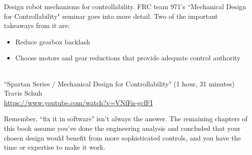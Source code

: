 Design robot mechanisms for controllability. FRC team 971's ``Mechanical Design
for Controllability" seminar goes into more detail. Two of the important
takeaways from it are:
\begin{itemize}
  \item Reduce gearbox backlash
  \item Choose motors and gear reductions that provide adequate control
        authority
\end{itemize}
\begin{bookfigure}
   \\
  ``Spartan Series / Mechanical Design for Controllability" (1 hour, 31 minutes)
    \\
  \footnotesize Travis Schuh \\
  \url{https://www.youtube.com/watch?v=VNfFn-gcfFI}
\end{bookfigure}

Remember, ``fix it in software" isn't always the answer. The remaining chapters
of this book assume you've done the engineering analysis and concluded that your
chosen design would benefit from more sophisticated controls, and you have the
time or expertise to make it work.
